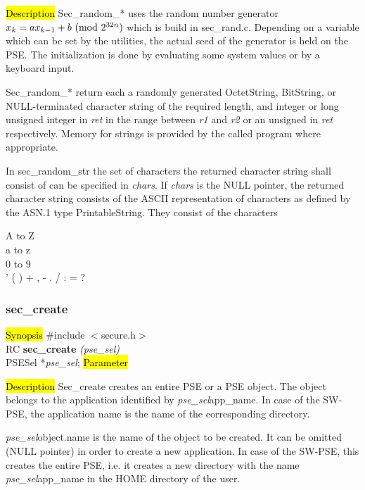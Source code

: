 \hl{Description}
Sec\_random\_* uses the random number generator $x_k = ax_{k-1} + b\ ({\rm mod}\ 2^{32n})$ which is build in
sec\_rand.c. Depending on a variable which can be set by the utilities, the actual seed of
the generator is held on the PSE. The initialization is done by evaluating some system values or
by a keyboard input.

Sec\_random\_* return each a randomly generated OctetString, BitString, or NULL-terminated
character string of the required length, and integer or long unsigned integer in {\em *ret} in the range between
{\em r1} and {\em r2} or an unsigned in {\em *ret} respectively. Memory for strings is provided by the called program
where appropriate. 

In sec\_random\_str the set of characters the returned character string shall consist of can
be specified in {\em chars}. If {\em chars} is the NULL pointer, the returned character string
consists of the ASCII representation of characters as defined by the ASN.1 type
PrintableString.
They consist of the characters
\begin{center}
{\small
A to Z \\
a to z \\
0 to 9 \\
' ( ) + , - . / : = ?  
}
\end {center}

\subsubsection{sec\_create}
\label{sec_create}
\hl{Synopsis}
\#include $<$secure.h$>$ \\ [0.5cm]
RC {\bf sec\_create} {\em (pse\_sel)} \\
PSESel *{\em pse\_sel};
\hl{Parameter}

\hl{Description}
Sec\_create creates an entire PSE or a PSE object. 
The object belongs to the application identified by {\em pse\_sel}\pf app\_name.
In case of the SW-PSE, the application name is the name of the corresponding directory. 

{\em pse\_sel}\pf object.name is the name of the object to be created. It can be omitted 
(NULL pointer) in order to create a new application. In case of the SW-PSE, 
this creates the entire PSE, i.e. it creates a new directory
with the name {\em pse\_sel}\pf app\_name in the HOME directory of
the user. 
 
